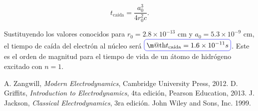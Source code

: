 \documentclass[a4paper,11pt]{article}
\makeatletter
\numberwithin{equation}{section}
\newcommand*{\boxcolor}{blue}
\renewcommand{\boxed}[1]{\textcolor{\boxcolor}{%
\tikz[baseline={([yshift=-1ex]current bounding box.center)}] \node [rectangle, minimum width=1ex,rounded corners,draw] {\normalcolor\m@th$\displaystyle#1$};}}
\makeatother
\begin{document}
\begin{equation}
 t_{\text{caída}} = \frac{a_0^3}{4r_0^2c}.
\end{equation}

Sustituyendo los valores conocidos para $r_0 = 2.8 \times 10^{-13}$ cm y 
$a_0 = 5.3 \times 10^{-9}$ cm, el tiempo de caída del electrón al núcleo será 
$\boxed{t_{\text{caída}} = 1.6 \times 10^{-11} s}$. Este es el orden de magnitud para el tiempo de 
vida de un átomo de hidrógeno excitado con $n=1$.

\begin{thebibliography}{10}
 A. Zangwill, \emph{Modern Electrodynamics}, Cambridge University Press, 2012.
 D. Griffits, \emph{Introduction to Electrodynamics}, 4ta edición, Pearson Education, 
 2013.
J. Jackson, \emph{Classical Electrodynamics}, 3ra edición. John Wiley and Sons, Inc. 
1999.
\end{thebibliography}
\end{document}
